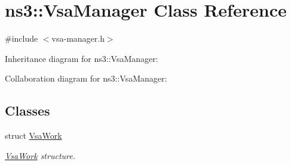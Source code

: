 \hypertarget{classns3_1_1VsaManager}{}\section{ns3\+:\+:Vsa\+Manager Class Reference}
\label{classns3_1_1VsaManager}


{\ttfamily \#include $<$vsa-\/manager.\+h$>$}



Inheritance diagram for ns3\+:\+:Vsa\+Manager\+:


Collaboration diagram for ns3\+:\+:Vsa\+Manager\+:
\subsection*{Classes}
\begin{DoxyCompactItemize}
\item 
struct \hyperlink{structns3_1_1VsaManager_1_1VsaWork}{Vsa\+Work}
\begin{DoxyCompactList}\small\item\em \hyperlink{structns3_1_1VsaManager_1_1VsaWork}{Vsa\+Work} structure. \end{DoxyCompactList}\end{DoxyCompactItemize}
